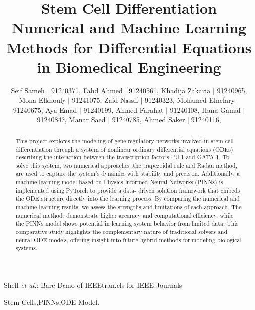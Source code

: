 \documentclass[journal]{IEEEtran}
\begin{document}
\title{Stem Cell Differentiation\\ \small{Numerical and Machine Learning Methods for Differential Equations in Biomedical Engineering}}

    \author{Seif Sameh $|$ 91240371,
        Fahd Ahmed $|$ 91240561,
        Khadija Zakaria $|$ 91240965,
        Mona Elkhouly $|$ 91241075,
        Zaid Nassif $|$ 91240323,
        Mohamed Elnefary $|$ 91240675,
        Aya Emad $|$ 91240199,
        Ahmed Farahat $|$ 91240108,
        Hana Gamal $|$ 91240843,
        Manar Saed $|$ 91240785,
        Ahmed Saker $|$ 91240116,
        }%
        
{Shell \MakeLowercase{\textit{et al.}}: Bare Demo of IEEEtran.cls for IEEE Journals}

\maketitle

\begin{abstract}
This project explores the modeling of gene regulatory networks involved in stem cell differentiation through a system of nonlinear ordinary differential equations (ODEs)
describing the interaction between the transcription factors PU.1 and GATA-1. To solve this system, two numerical approaches
,the trapezoidal rule and Radau method, are used to capture the system’s dynamics with stability and precision. Additionally, a machine learning model based on Physics Informed Neural Networks (PINNs) is implemented using PyTorch to provide a data-
driven solution framework that embeds the ODE structure directly into the learning process. By comparing the numerical and machine learning results, we assess the strengths and limitations of each approach. The numerical methods demonstrate higher accuracy and computational efficiency, while the PINNs model
shows potential in learning system behavior from limited data. This comparative study highlights the complementary nature of
traditional solvers and neural ODE models, offering insight into future hybrid methods for modeling biological systems.


\end{abstract}

\begin{IEEEkeywords}
Stem Cells,PINNs,ODE Model.
\end{IEEEkeywords}
\end{document}
